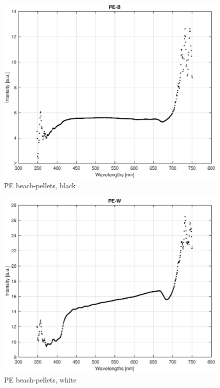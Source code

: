 \begin{appendices}
\begin{figure}
    \centering
    \includegraphics[width = 12cm]{Images/appendix/pe-beach-black.eps}
    \caption[PE Beach Pellets, Black]{PE beach-pellets, black}
    \label{fig:pe_beach_b}
\end{figure}

\begin{figure}
    \centering
    \includegraphics[width = 12cm]{Images/appendix/pe-beach-white.eps}
    \caption[PE Beach Pellets, White]{PE beach-pellets, white}
    \label{fig:pe_beach_w}
\end{figure}


\end{appendices}
